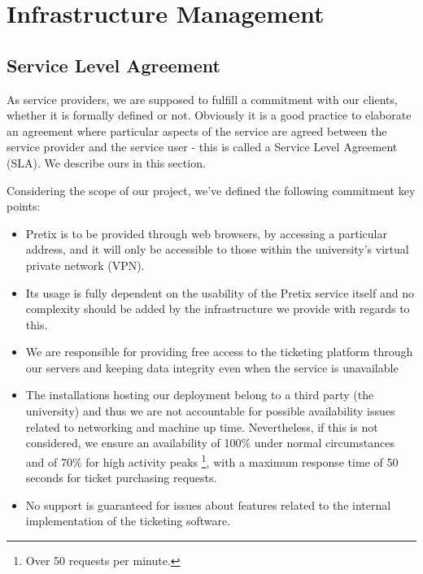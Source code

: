 \documentclass[12pt]{article}
\begin{document}
\newpage
\section{Infrastructure Management} \label{management} %

\subsection{Service Level Agreement} \label{management.sla} %


As service providers, we are supposed to fulfill a commitment with our clients, whether it is formally defined or not.
Obviously it is a good practice to elaborate an agreement where particular aspects of the service are agreed between the service provider and the service user -
this is called a Service Level Agreement (SLA).
We describe ours in this section.

Considering the scope of our project, we've defined the following commitment key points:
\vspace{-10pt}
\begin{itemize}[noitemsep]
  \item Pretix is to be provided through web browsers, by accessing a particular address, and it will only be accessible to those within the university's virtual private network (VPN).
  \item Its usage is fully dependent on the usability of the Pretix service itself and no complexity should be added by the infrastructure we provide with regards to this.
  \item We are responsible for providing free access to the ticketing platform through our servers and keeping data integrity even when the service is unavailable
  \item The installations hosting our deployment belong to a third party (the university) and thus we are not accountable for possible availability issues related to networking and machine up time.
        Nevertheless, if this is not considered, we ensure an availability of 100\% under normal circumstances and of 70\% for high activity peaks \footnote{Over 50 requests per minute.}, with a maximum response time of 50 seconds for ticket purchasing requests.
  \item No support is guaranteed for issues about features related to the internal implementation of the ticketing software.
\end{itemize}
\vspace{-10pt}
\end{document}
